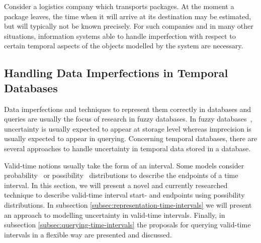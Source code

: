%
%
Consider a logistics company which transports packages. At the moment a package leaves, the time when it will arrive at its destination may be estimated, but will typically not be known precisely. For such companies and in many other situations, information systems able to handle imperfection with respect to certain temporal aspects of the objects modelled by the system are necessary.

\subsection{Handling Data Imperfections in Temporal Databases}


Data imperfections and techniques to represent them correctly in databases and queries are usually the focus of research in fuzzy databases. In fuzzy databases~\cite{Galindo2006}, uncertainty is usually expected to appear at storage level whereas imprecision is usually expected to appear in querying. Concerning temporal databases, there are several approaches to handle uncertainty in temporal data stored in a database.

Valid-time notions usually take the form of an interval. Some models consider probability~\cite{Dekhtyar2001} or possibility~\cite{Dubois89} distributions to describe the endpoints of a time interval. In this section, we will present a novel and currently researched technique to describe valid-time interval start- and endpoints using possibility distributions. In subsection \ref{subsec:representation-time-intervals} we will present an approach to modelling uncertainty in valid-time intervals. Finally, in subsection \ref{subsec:querying-time-intervals} the proposals for querying valid-time intervals in a flexible way are presented and discussed.%

